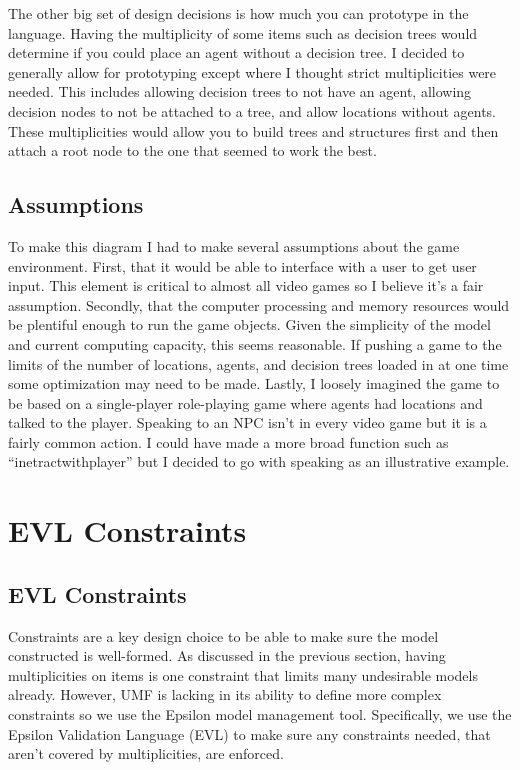 \documentclass[letterpaper,12pt]{article}  %
\begin{document}
The other big set of design decisions is how much you can prototype in the language. Having the multiplicity of some items such as decision trees would determine if you could place an agent without a decision tree. I decided to generally allow for prototyping except where I thought strict multiplicities were needed. This includes allowing decision trees to not have an agent, allowing decision nodes to not be attached to a tree, and allow locations without agents. These multiplicities would allow you to build trees and structures first and then attach a root node to the one that seemed to work the best.

\subsection{Assumptions}
To make this diagram I had to make several assumptions about the game environment. First, that it would be able to interface with a user to get user input. This element is critical to almost all video games so I believe it’s a fair assumption. Secondly, that the computer processing and memory resources would be plentiful enough to run the game objects. Given the simplicity of the model and current computing capacity, this seems reasonable. If pushing a game to the limits of the number of locations, agents, and decision trees loaded in at one time some optimization may need to be made. Lastly, I loosely imagined the game to be based on a single-player role-playing game where agents had locations and talked to the player. Speaking to an NPC isn’t in every video game but it is a fairly common action. I could have made a more broad function such as “inetractwithplayer” but I decided to go with speaking as an illustrative example.








\section{EVL Constraints}
\subsection{EVL Constraints}

Constraints are a key design choice to be able to make sure the model constructed is well-formed. As discussed in the previous section, having multiplicities on items is one constraint that limits many undesirable models already. However, UMF is lacking in its ability to define more complex constraints so we use the Epsilon model management tool. Specifically, we use the Epsilon Validation Language (EVL) to make sure any constraints needed, that aren’t covered by multiplicities, are enforced.
\end{document}
